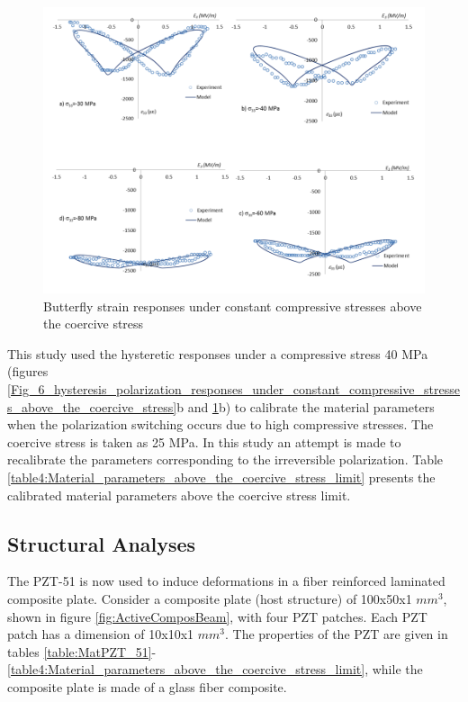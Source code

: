 \begin{figure} 
\centering 
\includegraphics[width=6.0in]{./chap_2_pol_sw/figures/fig_7_butterfly_strain_responses_under_constant_compressive_stresses_above_the_coercive_stress.png} 
\caption{Butterfly strain responses under constant compressive stresses above the coercive stress}
\label{fig_7_butterfly_strain_responses_under_constant_compressive_stresses_above_the_coercive_stress}
\end{figure}
This study used the hysteretic responses under a compressive stress 40 MPa (figures \ref{Fig_6_hysteresis_polarization_responses_under_constant_compressive_stresses_above_the_coercive_stress}b and \ref{fig_7_butterfly_strain_responses_under_constant_compressive_stresses_above_the_coercive_stress}b) to calibrate the material parameters when the polarization switching occurs due to high compressive stresses.  
The coercive stress is taken as 25 MPa. 
In this study an attempt is made to recalibrate the parameters corresponding to the irreversible polarization. 
Table \ref{table4:Material_parameters_above_the_coercive_stress_limit} presents the calibrated material parameters above the coercive stress limit. 
\newpage



\subsection{Structural Analyses}

The PZT-51 is now used to induce deformations in a fiber reinforced laminated composite plate. 
Consider a composite plate (host structure) of 100x50x1 $mm^3$, shown in figure \ref{fig:ActiveComposBeam}, with four PZT patches. 
Each PZT patch has a dimension of 10x10x1 $mm^3$. 
The properties of the PZT are given in tables \ref{table:MatPZT_51}-\ref{table4:Material_parameters_above_the_coercive_stress_limit}, while the composite plate is made of a glass fiber composite. 


